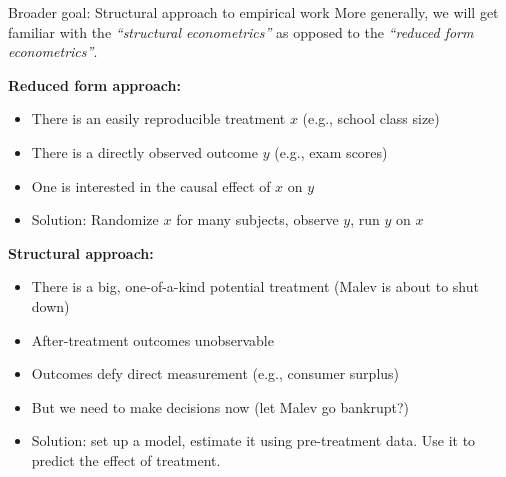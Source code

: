 \begin{frame}{Broader goal: Structural approach to empirical work}
	More generally, we will get familiar with the \emph{``structural econometrics''} as opposed to the \emph{``reduced form econometrics''}.
	
	\textbf{Reduced form approach:}
	\begin{itemize}
		\item{There is an easily reproducible treatment $x$ (e.g., school class size)}
		\item{There is a directly observed outcome $y$ (e.g., exam scores)}
		\item{One is interested in the causal effect of $x$ on $y$}
		\item{Solution: Randomize $x$ for many subjects, observe $y$, run $y$ on $x$}
	\end{itemize}
	
	\textbf{Structural approach:}
	\begin{itemize}
		\item{There is a big, one-of-a-kind potential treatment (Malev is about to shut down)}
		\item{After-treatment outcomes unobservable}
		\item{Outcomes defy direct measurement (e.g., consumer surplus)}
		\item{But we need to make decisions now (let Malev go bankrupt?)}
		\item{Solution: set up a model, estimate it using pre-treatment data. Use it to predict the effect of treatment.}
	\end{itemize}
\end{frame}



